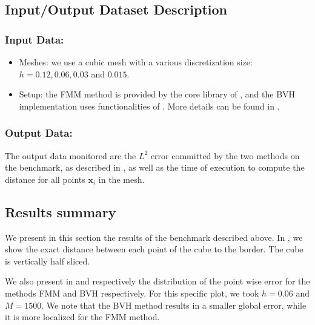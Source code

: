 

\subsection{Input/Output Dataset Description}


\subsubsection{Input Data:}
  \begin{itemize}
  \item Meshes: we use a cubic mesh with a various discretization size: $h = 0.12, 0.06, 0.03$ and $0.015$.
  \item Setup: the FMM method is provided by the core library of \Feelpp, and the BVH implementation uses functionalities of \Feelpp.
    More details can be found in \cite{van_landeghem_micro-swimming_2025}.
  \end{itemize}


\subsubsection{Output Data:}

The output data monitored are the $L^2$ error committed by the two methods on the benchmark, as described in ,
as well as the time of execution to compute the distance for all points $\mathbf{x}_i$ in the mesh.



\subsection{Results summary}

We present in this section the results of the benchmark described above.
In , we show the exact distance between each point of the cube to the border.
The cube is vertically half sliced.

We also present in  and  respectively the distribution of the point wise error for the methods FMM and BVH respectively.
For this specific plot, we took $h=0.06$ and $M=1500$.
We note that the BVH method results in a smaller global error, while it is more localized for the FMM method.


